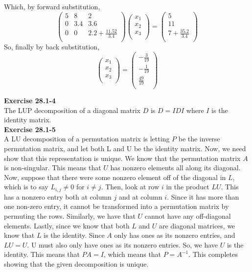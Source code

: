 \documentclass{article}
\begin{document}
Which, by forward substitution,
\[
 \left(\begin{array}{ccc}
 5&8&2\\
 0&3.4&3.6\\
 0&0&2.2 +\frac{11.52}{3.4}\\
 \end{array}\right) 
  \left(\begin{array}{c}
 x_1\\
 x_2\\
 x_3\\
 \end{array}\right) 
=
  \left(\begin{array}{c}
 5\\
 11\\
 7 + \frac{35.2}{3.4}\\
 \end{array}\right) 
\]
So, finally by back substitution,
\[
  \left(\begin{array}{c}
 x_1\\
 x_2\\
 x_3\\
 \end{array}\right) 
=
  \left(\begin{array}{c}
 -\frac{3}{19}\\
 -\frac{1}{19}\\
 \frac{49}{19}\\
 \end{array}\right) 
\]

\noindent\textbf{Exercise 28.1-4}\\

The LUP decomposition of a diagonal matrix $D$ is $D = I D I$ where $I$ is the identity matrix.\\

\noindent\textbf{Exercise 28.1-5}\\

A LU decomposition of a permutation matrix is letting $P$ be the inverse permutation matrix, and let both L and U be the identity matrix. Now, we need show that this representation is unique. We know that the permutation matrix $A$ is non-singular. This means that $U$ has nonzero elements all along its diagonal. Now, suppose that there were some nonzero element off of the diagonal in $L$, which is to say $L_{i,j}\neq 0$ for $i\neq j$. Then, look at row $i$ in the product $LU$. This has a nonzero entry both at column $j$ and at column $i$. Since it has more than one non-zero entry, it cannot be transformed into a permutation matrix by permuting the rows. Similarly, we have that $U$ cannot have any off-diagonal elements. Lastly, since we know that both $L$ and $U$ are diagonal matrices, we know that $L$ is the identity. Since $A$ only has ones as its nonzero entries, and $LU =U$. U must also only have ones as its nonzero entries. So, we have $U$ is the identity. This means that $PA =I$, which means that $P = A^{-1}$. This completes showing that the given decomposition is unique.\\
\end{document}
